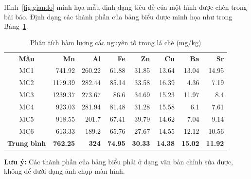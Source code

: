 Hình~\ref{fig:giando} minh họa mẫu định dạng tiêu đề của một hình được chèn trong bài báo. Định dạng các thành phần của bảng biểu được minh họa như trong Bảng~\ref{tab:pt1}.

\setlength{\intextsep}{6pt}
\begin{table}[htbp]
	\centering
	\caption{Phân tích hàm lượng các nguyên tố trong lá chè (mg/kg)}
	\begin{tabular}{crrrrrrr}
		&       &       &       &       &       &       &  \\
		\midrule
		\textbf{Mẫu} & 
		\textbf{Mn} & 
		\textbf{Al} & 
		\textbf{Fe} & 
		\textbf{Zn} & 
		\textbf{Cu} & 
		\textbf{Ba} & 
		\textbf{Sr} \\
		\midrule
		MC1 & 741.92 & 260.22 & 61.88 & 31.85 & 13.64 & 13.04 & 14.95 \\
		MC2 & 1179.39 & 282.44 & 85.14 & 33.58 & 16.39 & 4.36  & 7.19 \\
		MC3 & 1239.37 & 273.67 & 86.6  & 34.69 & 15.23 & 11.97 & 8.4 \\
		MC4 & 923.03 & 281.94 & 81.48 & 31.28 & 15.58 & 6.1 & 7.61 \\
		MC5 & 918.55 & 201.7 & 67.41 & 39.79 & 14.62 & 7.04 & 9.14 \\
		MC6 & 613.33 & 189.2 & 65.76 & 27.67 & 14.55 & 12.12 & 10.56 \\
		\textbf{Trung bình} & \textbf{762.25} & \textbf{324} & \textbf{74.95} & \textbf{30.33} & \textbf{14.38} & \textbf{15.02} & \textbf{11.92} \\
	\end{tabular}%
	\label{tab:pt1}%
\end{table}%

\textbf{Lưu ý:} Các thành phần của bảng biểu phải ở dạng văn bản chỉnh sửa được, không để dưới dạng ảnh chụp màn hình. 

